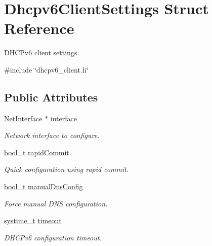 \hypertarget{structDhcpv6ClientSettings}{}\section{Dhcpv6\+Client\+Settings Struct Reference}
\label{structDhcpv6ClientSettings}


D\+H\+C\+Pv6 client settings.  




{\ttfamily \#include \char`\"{}dhcpv6\+\_\+client.\+h\char`\"{}}

\subsection*{Public Attributes}
\begin{DoxyCompactItemize}
\item 
\hyperlink{net_8h_a2234db8911a1148c9159979d8f5e0d6b}{Net\+Interface} $\ast$ \hyperlink{structDhcpv6ClientSettings_ad74dca8474a1b0f8641dd2395ec910df}{interface}
\begin{DoxyCompactList}\small\item\em Network interface to configure. \end{DoxyCompactList}\item 
\hyperlink{compiler__port_8h_a812d16e5494522586b3784e55d479912}{bool\+\_\+t} \hyperlink{structDhcpv6ClientSettings_af936a8d0ccae32e933868a92b3a58768}{rapid\+Commit}
\begin{DoxyCompactList}\small\item\em Quick configuration using rapid commit. \end{DoxyCompactList}\item 
\hyperlink{compiler__port_8h_a812d16e5494522586b3784e55d479912}{bool\+\_\+t} \hyperlink{structDhcpv6ClientSettings_a12c720ce782bb7124c146e8b5bf19cca}{manual\+Dns\+Config}
\begin{DoxyCompactList}\small\item\em Force manual D\+NS configuration. \end{DoxyCompactList}\item 
\hyperlink{compiler__port_8h_ae3e32a98d431a02106616da3071832dd}{systime\+\_\+t} \hyperlink{structDhcpv6ClientSettings_a440db6e60279995a67d8b3d522ca6f92}{timeout}
\begin{DoxyCompactList}\small\item\em D\+H\+C\+Pv6 configuration timeout. \end{DoxyCompactList}\item 

\end{DoxyCompactItemize}
